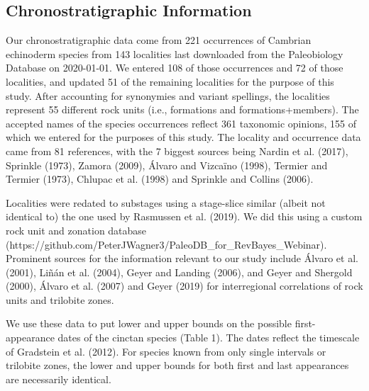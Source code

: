 \documentclass{article}
\begin{document}
\subsection{Chronostratigraphic Information}
Our chronostratigraphic data come from 221 occurrences of Cambrian echinoderm species from 143 localities last downloaded from the Paleobiology Database on 2020-01-01. We entered 108 of those occurrences and 72 of those localities, and updated 51 of the remaining localities for the purpose of this study.  After accounting for synonymies and variant spellings, the localities represent 55 different rock units (i.e., formations and formations+members).  The accepted names of the species occurrences reflect 361 taxonomic opinions, 155 of which we entered for the purposes of this study.  The locality and occurrence data came from 81 references, with the 7 biggest sources being Nardin et al. (2017), Sprinkle (1973), Zamora (2009), Álvaro and Vizcaïno (1998), Termier and Termier (1973), Chlupac et al. (1998) and Sprinkle and Collins (2006).

Localities were redated to substages using a stage-slice similar (albeit not identical to) the one used by Rasmussen et al. (2019). We did this using a custom rock unit and zonation database (https://github.com/PeterJWagner3/PaleoDB\_for\_RevBayes\_Webinar). Prominent sources for the information relevant to our study include Álvaro et al. (2001), Liñán et al. (2004), Geyer and Landing (2006), and Geyer and Shergold (2000), Álvaro et al. (2007) and Geyer (2019) for interregional correlations of rock units and trilobite zones.

We use these data to put lower and upper bounds on the possible first-appearance dates of the cinctan species (Table 1).  The dates reflect the timescale of Gradstein et al. (2012). For species known from only single intervals or trilobite zones, the lower and upper bounds for both first and last appearances are necessarily identical. 
\end{document}
